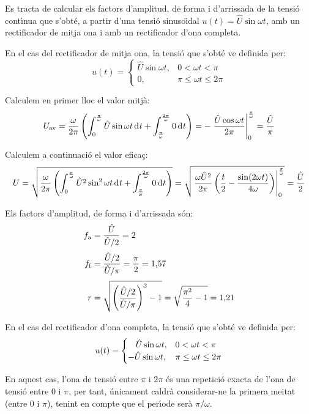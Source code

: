 \begin{exemple}
Es tracta de calcular els factors d'amplitud, de forma i d'arrissada
de la tensi\'{o} cont\'{\i}nua que s'obt\'{e}, a partir d'una tensi\'{o} sinuso\"{\i}dal
$u(t) = \hat{U} \sin\omega t$, amb un rectificador de mitja ona i
amb un rectificador d'ona completa.

En el cas del rectificador de mitja ona, la tensi\'{o} que s'obt\'{e} ve
definida per:
\[
u(t) = \begin{cases} \hat{U} \sin\omega t, & 0 < \omega t < \pi\\
       0, & \pi \leq \omega t \leq 2\pi \end{cases}
\]

Calculem en primer lloc el valor mitj\`{a}:
\[
U\ped{av} = \frac{\omega}{2\pi} \left( \int_0^\frac{\pi}{\omega}
\hat{U} \sin\omega t \diff t +
\int_\frac{\pi}{\omega}^\frac{2\pi}{\omega} 0 \diff t \right) = -
\left. \frac{\hat{U} \cos\omega t}{2\pi}
\right|_0^\frac{\pi}{\omega} = \frac{\hat{U}}{\pi}
\]

Calculem a continuaci\'{o} el valor efica\c{c}:
\[
U = \sqrt{\frac{\omega}{2\pi} \left( \int_0^\frac{\pi}{\omega}
\hat{U}^2 \sin^2\omega t \diff t +
\int_\frac{\pi}{\omega}^\frac{2\pi}{\omega} 0 \diff t \right)} =
  \sqrt{\left.\frac{\omega \hat{U}^2}{2\pi}\left( \frac{t}{2} -
\frac{\sin (2\omega t)}{4\omega}
\right)\right|_0^\frac{\pi}{\omega}} = \frac{\hat{U}}{2}
\]

Els factors d'amplitud, de forma i d'arrissada s\'{o}n:
\begin{align*}
    f_\mathrm{a} &= \frac{\hat{U}}{\hat{U}/2} = 2 \\[0.5ex]
    f_\mathrm{f} &= \frac{\hat{U}/2}{\hat{U}/\pi} =\frac{\pi}{2} =
    1{,}57 \\[0.5ex]
    r &= \sqrt{\left(\frac{\hat{U}/2}{\hat{U}/\pi}\right)^2-1} =
\sqrt{\frac{\pi^2}{4}-1} = 1{,}21
\end{align*}


En el cas del rectificador d'ona completa, la tensi\'{o} que s'obt\'{e} ve
definida per:
\[
u(t) = \begin{cases} \rule{3.2mm}{0pt}\hat{U} \sin\omega t, & 0 < \omega t < \pi\\
       -\hat{U} \sin\omega t, & \pi \leq \omega t \leq 2\pi \end{cases}
\]

En aquest cas, l'ona de tensi\'{o} entre $\pi$ i $2\pi$ \'{e}s una repetici\'{o}
exacta de l'ona de tensi\'{o} entre 0 i $\pi$, per tant, \'{u}nicament
caldr\`{a} considerar-ne la primera meitat (entre 0 i $\pi$), tenint en
compte que el per\'{\i}ode ser\`{a} $\pi/\omega$.


\end{exemple}
